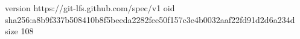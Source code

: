 version https://git-lfs.github.com/spec/v1
oid sha256:a8b9f337b508410b8f5beeda2282fee50f157c3e4b0032aaf22fd91d2d6a234d
size 108
